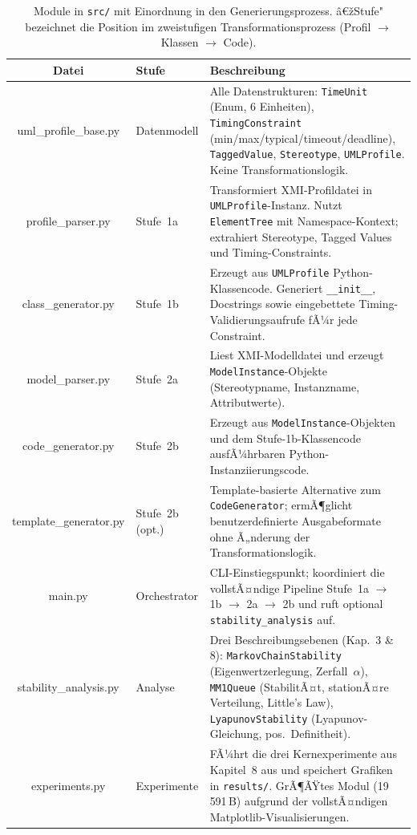 ﻿\documentclass[a4paper,12pt]{scrreprt}
\theoremstyle{definition}
\begin{document}
\begin{table}[H]
	\small
	\centering
	\renewcommand{\arraystretch}{1.35}
	\begin{tabular}{@{} C l p{6.1cm} @{}}
		\toprule
		\normalfont\textbf{Datei} &
		\textbf{Stufe} &
		\textbf{Beschreibung} \\
		\midrule
		uml\_profile\_base.py  & Datenmodell &
		Alle Datenstrukturen: \texttt{TimeUnit} (Enum, 6 Einheiten),
		\texttt{TimingConstraint} (min/max/typical/timeout/deadline),
		\texttt{TaggedValue}, \texttt{Stereotype}, \texttt{UMLProfile}.
		Keine Transformationslogik. \\
		
		profile\_parser.py     & Stufe~1a &
		Transformiert XMI-Profildatei in \texttt{UMLProfile}-Instanz.
		Nutzt \texttt{ElementTree} mit Namespace-Kontext; extrahiert
		Stereotype, Tagged Values und Timing-Constraints. \\
		
		class\_generator.py    & Stufe~1b &
		Erzeugt aus \texttt{UMLProfile} Python-Klassencode.
		Generiert \texttt{\_\_init\_\_}, Docstrings sowie eingebettete
		Timing-Validierungsaufrufe fÃ¼r jede Constraint. \\
		
		model\_parser.py       & Stufe~2a &
		Liest XMI-Modelldatei und erzeugt \texttt{ModelInstance}-Objekte
		(Stereotypname, Instanzname, Attributwerte). \\
		
		code\_generator.py     & Stufe~2b &
		Erzeugt aus \texttt{ModelInstance}-Objekten und dem
		Stufe-1b-Klassencode ausfÃ¼hrbaren Python-Instanziierungscode. \\
		
		template\_generator.py & Stufe~2b (opt.) &
		Template-basierte Alternative zum \texttt{CodeGenerator};
		ermÃ¶glicht benutzerdefinierte Ausgabeformate ohne Ã„nderung
		der Transformationslogik. \\
		
		main.py                & Orchestrator &
		CLI-Einstiegspunkt; koordiniert die vollstÃ¤ndige Pipeline
		Stufe~1a $\to$ 1b $\to$ 2a $\to$ 2b und ruft optional
		\texttt{stability\_analysis} auf. \\
		
		stability\_analysis.py & Analyse &
		Drei Beschreibungsebenen (Kap.~3 \& 8):
		\texttt{MarkovChainStability} (Eigenwertzerlegung, Zerfall~$\alpha$),
		\texttt{MM1Queue} (StabilitÃ¤t, stationÃ¤re Verteilung, Little's Law),
		\texttt{LyapunovStability} (Lyapunov-Gleichung, pos.\ Definitheit). \\
		
		experiments.py         & Experimente &
		FÃ¼hrt die drei Kernexperimente aus Kapitel~8 aus und speichert
		Grafiken in \texttt{results/}. GrÃ¶ÃŸtes Modul (19\,591\,B)
		aufgrund der vollstÃ¤ndigen Matplotlib-Visualisierungen. \\
		\bottomrule
	\end{tabular}
	\caption{Module in \texttt{src/} mit Einordnung in den
		Generierungsprozess.  â€žStufe" bezeichnet die Position
		im zweistufigen Transformationsprozess
		(Profil $\to$ Klassen $\to$ Code).}
	\label{tab:module-src}
\end{table}
\end{document}
